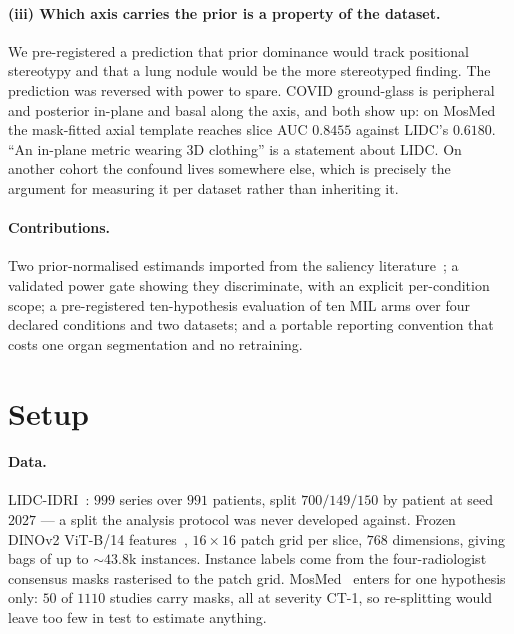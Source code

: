 \documentclass[10pt]{article}
\begin{document}
\paragraph{(iii) Which axis carries the prior is a property of the dataset.} We
pre-registered a prediction that prior dominance would track positional
stereotypy and that a lung nodule would be the more stereotyped finding. The
prediction was reversed with power to spare. COVID ground-glass is peripheral
and posterior in-plane and basal along the axis, and both show up: on MosMed the
mask-fitted axial template reaches slice AUC $0.8455$ against LIDC's $0.6180$.
``An in-plane metric wearing 3D clothing'' is a statement about LIDC. On another
cohort the confound lives somewhere else, which is precisely the argument for
measuring it per dataset rather than inheriting it.

\paragraph{Contributions.} Two prior-normalised estimands imported from the
saliency literature~\citep{kummerer2015,borji2013,bylinskii2019}; a validated
power gate showing they discriminate, with an explicit per-condition scope; a
pre-registered ten-hypothesis evaluation of ten MIL arms over four declared
conditions and two datasets; and a portable reporting convention that costs one
organ segmentation and no retraining.

\section{Setup}

\paragraph{Data.} LIDC-IDRI~\citep{armato2011lidc}: $999$ series over $991$
patients, split $700/149/150$ by patient at seed $2027$ --- a split the analysis
protocol was never developed against. Frozen DINOv2 ViT-B/14
features~\citep{oquab2024dinov2}, $16\times16$ patch grid per slice, $768$
dimensions, giving bags of up to ${\sim}43.8$k instances. Instance labels come
from the four-radiologist consensus masks rasterised to the patch grid.
MosMed~\citep{morozov2020mosmed} enters for one hypothesis only: $50$ of $1110$
studies carry masks, all at severity CT-1, so re-splitting would leave too few
in test to estimate anything.
\end{document}
